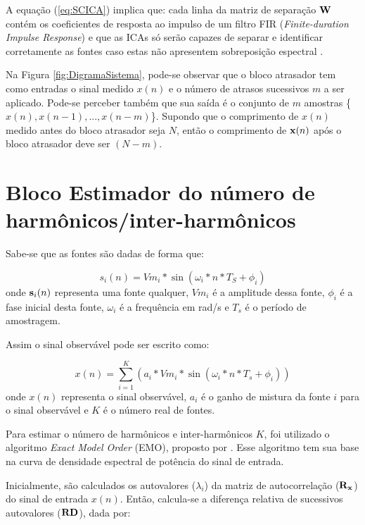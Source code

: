 \documentclass[a4paper,12pt]{monografia}
\theoremstyle{plain}
\theoremstyle{definition}
\theoremstyle{remark}
\begin{document}
A equação (\ref{eq:SCICA}) implica que: cada linha da matriz de separação ${\bf W}$ contém os coeficientes de resposta ao impulso de um filtro FIR (\textit{Finite-duration Impulse Response}) e que as ICAs só serão capazes de separar e identificar corretamente as fontes caso estas não apresentem sobreposição espectral \cite{limanova}.

Na Figura \ref{fig:DigramaSistema}, pode-se observar que o bloco atrasador tem como entradas o sinal medido $x(n)$ e o número de atrasos sucessivos $m$ a ser aplicado. Pode-se perceber também que sua saída é o conjunto de $m$ amostras \{$x(n), x(n-1),..., x(n-m)$\}. Supondo que o comprimento de $x(n)$ medido antes do bloco atrasador seja $N$, então o comprimento de ${\bf x}(n)$ após o bloco atrasador deve ser $(N-m)$. 

\section{Bloco Estimador do número de harmônicos/inter-harmônicos}

Sabe-se que as fontes são dadas de forma que:
 
\begin{equation}
    {s}_{i}(n)=Vm_{i}*\sin(\omega_{i}*n*T_S+\phi_{i})
    \label{eq:SinalEstimacao1}
\end{equation}
onde ${\bf s}_{i}(n)$ representa uma fonte qualquer, $Vm_{i}$ é a amplitude dessa fonte, $\phi_{i}$ é a fase inicial desta fonte, $\omega_{i}$ é a frequência em rad/s e $T_s$ é o período de amostragem.

Assim o sinal observável pode ser escrito como:

\begin{equation}
     x(n)=\sum_{i=1}^{K}(a_{i}*Vm_{i}*\sin(\omega_{i}*n*T_s+\phi_{i}))
    \label{eq:SinalEstimacao0}
\end{equation}
onde $x(n)$ representa o sinal observável,  $a_{i}$ é o ganho de mistura da fonte $i$ para o sinal observável e $K$ é o número real de fontes.

Para estimar o número de harmônicos e inter-harmônicos $K$, foi utilizado o algoritmo \textit{Exact Model Order} (EMO), proposto por \cite{jain2012exact}. Esse algoritmo tem sua base na curva de densidade espectral de potência do sinal de entrada.

Inicialmente, são calculados os autovalores ($\lambda_i$)  da matriz de autocorrelação (${\bf R_{x}}$) do sinal de entrada $x(n)$. Então, calcula-se a diferença relativa de sucessivos autovalores (${\bf RD}$), dada por:
\end{document}
